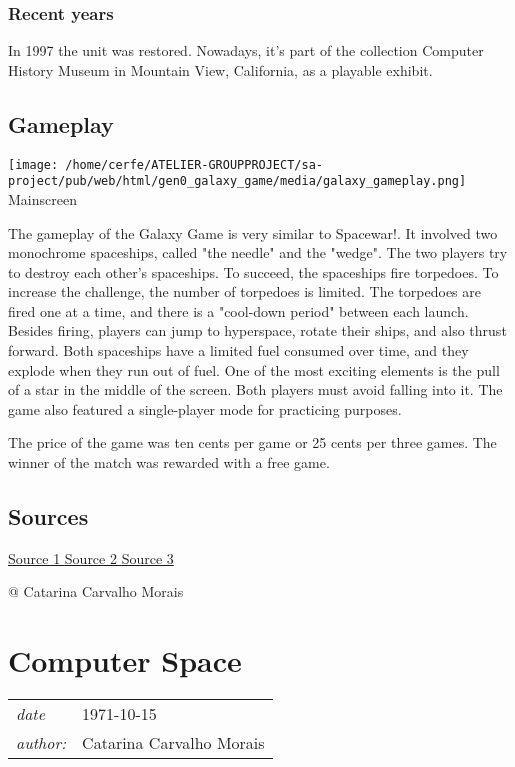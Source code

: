 \documentclass[a4paper,10pt]{book}
\newcommand{\pageHeader}[4]{
    \section{#1}
    \vspace{-0.3cm}
    \begin{table}[h!]
     \begin{tabular}{ll}
        \hline
        \textit{date} & #2 \\
        \textit{author: } & #3\\
        \hline
     \end{tabular}
    \end{table}
    \vspace{-0.3cm}
}
\begin{document}
 \subsubsection{Recent years }
 In 1997 the unit was restored. Nowadays, it's part of the collection Computer History Museum in Mountain View, California, as a playable exhibit. 
 
 \subsection{Gameplay }
 
 \texttt{[image: /home/cerfe/ATELIER-GROUPPROJECT/sa-project/pub/web/html/gen0\_galaxy\_game/media/galaxy\_gameplay.png]}
 Mainscreen 
 
 
            The gameplay of the Galaxy Game is very similar to Spacewar!. It involved two monochrome spaceships, called "the needle" and the "wedge". The two players try to destroy each other's spaceships. To succeed, the spaceships fire torpedoes. To increase the challenge, the number of torpedoes is limited. The torpedoes are fired one at a time, and there is a "cool-down period" between each launch. 
            Besides firing, players can jump to hyperspace, rotate their ships, and also thrust forward. Both spaceships have a limited fuel consumed over time, and they explode when they run out of fuel. 
            One of the most exciting elements is the pull of a star in the middle of the screen. Both players must avoid falling into it. 
            The game also featured a single-player mode for practicing purposes. 
 
 The price of the game was ten cents per game or 25 cents per three games. The winner of the match was rewarded with a free game. 
 
 
 
 \subsection{Sources }
 
 \href{https://en.wikipedia.org/wiki/Galaxy_Game}{Source 1 }
 \href{https://archive.org/details/arcade_galgame}{Source 2 }
 \href{http://infolab.stanford.edu/pub/voy/museum/galaxy.html}{Source 3 }
 
 
 
 @ Catarina Carvalho Morais 
 
 \newpage\pageHeader{Computer Space}{1971-10-15}{Catarina Carvalho Morais}{Computer Space, an arcade game created in 1971}
\end{document}
